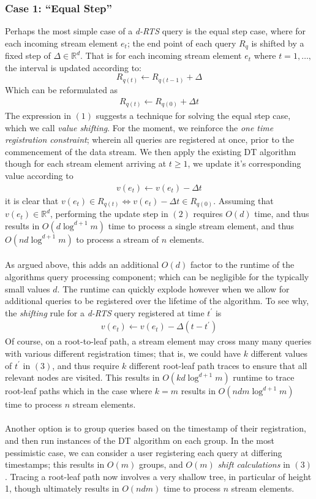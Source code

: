 \documentclass{article}
\begin{document}
\subsubsection*{Case 1: ``Equal Step''}
Perhaps the most simple case of a \textit{d-RTS} query is the equal step case, where for each incoming stream element $e_t$; the end point of each query $R_q$ is shifted by a fixed step of $\Delta\in\mathbb{R}^d$. That is for each incoming stream element $e_t$ where $t = 1,\dots,$ the interval is updated according to: 
$$R_{q(t)} \leftarrow R_{q(t-1)} + \Delta$$
Which can be reformulated as 
\begin{align}
    R_{q(t)} \leftarrow R_{q(0)} + \Delta t
\end{align}
The expression in $(1)$ suggests a technique for solving the equal step case, which we call \textit{value shifting}. For the moment, we reinforce the \textit{one time registration constraint}; wherein all queries are registered at once, prior to the commencement of the data stream. We then apply the existing DT algorithm though for each stream element arriving at $t\geq1$, we update it's corresponding value according to 
\begin{align}
    v(e_t) \leftarrow v(e_t) - \Delta t
\end{align}
it is clear that $v(e_t) \in R_{q(t)} \iff v(e_t)-\Delta t \in R_{q(0)}$. Assuming that $v(e_t)\in\mathbb{R}^d$, performing the update step in $(2)$ requires $O(d)$ time, and thus results in $O(d\log^{d+1}m)$ time to process a single stream element, and thus $O(nd\log^{d+1}m)$ to process a stream of $n$ elements. \\
\\
As argued above, this adds an additional $O(d)$ factor to the runtime of the algorithms query processing component; which can be negligible for the typically small values $d$. The runtime can quickly explode however when we allow for additional queries to be registered over the lifetime of the algorithm. To see why, the \textit{shifting} rule for a \textit{d-RTS} query registered at time $t^\prime$ is
\begin{align}
    v(e_t) \leftarrow v(e_t) - \Delta(t - t^\prime)
\end{align}
Of course, on a root-to-leaf path, a stream element may cross many many queries with various different registration times; that is, we could have $k$ different values of $t^\prime$ in $(3)$, and thus require $k$ different root-leaf path traces to ensure that all relevant nodes are visited. This results in $O(kd\log^{d+1}m)$ runtime to trace root-leaf paths which in the case where $k=m$ results in $O(ndm\log^{d+1}m)$ time to process $n$ stream elements.\\
\\
Another option is to group queries based on the timestamp of their registration, and then run instances of the DT algorithm on each group. In the most pessimistic case, we can consider a user registering each query at differing timestamps; this results in $O(m)$ groups, and $O(m)$ \textit{shift calculations} in $(3)$. Tracing a root-leaf path now involves a very shallow tree, in particular of height 1, though ultimately results in $O(ndm)$ time to process $n$ stream elements.
\end{document}
